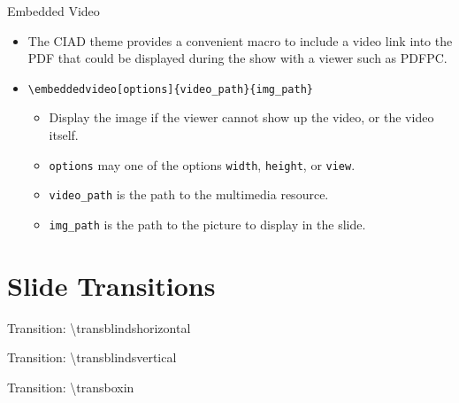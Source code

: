 \documentclass[english,sectioncirclenumberstyle]{ciadbeamer}
\begin{document}
\begin{frame}{Embedded Video}
	\begin{itemize}
	\item The CIAD theme provides a convenient macro to include a video link into the PDF that could be displayed during the show with a viewer such as PDFPC.
	\item \texttt{{\textbackslash}embeddedvideo[options]\{video\_path\}\{img\_path\}}
		\begin{itemize}
		\item Display the image if the viewer cannot show up the video, or the video itself.
		\item \texttt{options} may one of the options \texttt{width}, \texttt{height}, or \texttt{view}.
		\item \texttt{video\_path} is the path to the multimedia resource.
		\item \texttt{img\_path} is the path to the picture to display in the slide.
		\end{itemize}
	\end{itemize}
\end{frame}

\section{Slide Transitions}
\sectiontableofcontentslide


\begin{frame}[c]{Transition: {\textbackslash}transblindshorizontal}
	\transblindshorizontal
	\begin{center}
	\end{center}
\end{frame}

\begin{frame}[c]{Transition: {\textbackslash}transblindsvertical}
	\transblindsvertical
	\begin{center}
	\end{center}
\end{frame}

\begin{frame}[c]{Transition: {\textbackslash}transboxin}
	\transboxin
	\begin{center}
	\end{center}
\end{frame}
\end{document}
